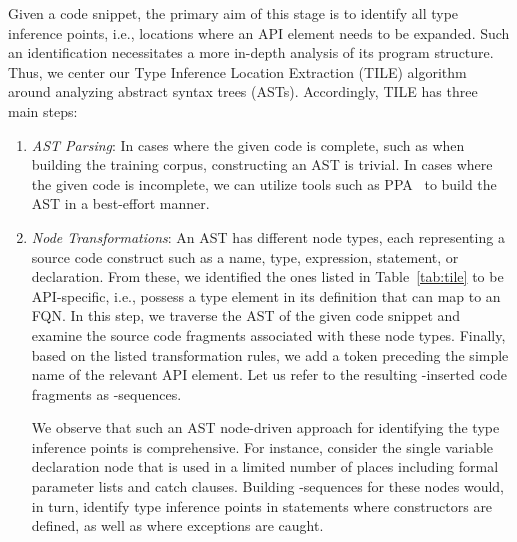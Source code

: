 


Given a code snippet, the primary aim of this stage is to identify all type inference points, i.e., locations where an API element needs to be expanded. Such an identification necessitates a more in-depth analysis of its program structure. Thus, we center our Type Inference Location Extraction (TILE) algorithm around analyzing abstract syntax trees (ASTs). Accordingly, TILE has three main steps:

\begin{enumerate}
    \item \textit{AST Parsing}: In cases where the given code is complete, such as when building the training corpus, constructing an AST is trivial. In cases where the given code is incomplete, we can utilize tools such as PPA~\cite{dagenais-oopsla08} to build the AST in a best-effort manner. 

    \item \textit{Node Transformations}: An AST has different node types, each representing a source code construct such as a name, type, expression, statement, or declaration. From these, we identified the ones listed in Table~\ref{tab:tile} to be API-specific, i.e., possess a type element in its definition that can map to an FQN. In this step, we traverse the AST of the given code snippet and examine the source code fragments associated with these node types. Finally, based on the listed transformation rules, we add a  token preceding the simple name of the relevant API element. Let us refer to the resulting -inserted code fragments as -sequences.

    We observe that such an AST node-driven approach for identifying the type inference points is comprehensive. For instance, consider the single variable declaration node that is used in a limited number of places including formal parameter lists and catch clauses. Building -sequences for these nodes would, in turn, identify type inference points in statements where constructors are defined, as well as where exceptions are caught.


\end{enumerate}

